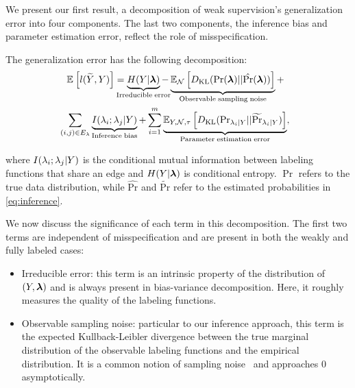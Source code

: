 
We present our first result, a decomposition of weak supervision's generalization error into four components. The last two components, the inference bias and parameter estimation error, reflect the role of misspecification.
\begin{theorem}
The generalization error has the following decomposition:
\begin{align}
    &\E{}{l(\widetilde{Y}, Y)} = \underbrace{H(Y | \bm{\lf})}_{\mathclap{\mathrm{Irreducible \; error}}} - \underbrace{\E{\N}{\KL(\Pr(\bm{\lf}) || \hat{\Pr}(\bm{\lf}))}}_{\mathrm{Observable \; sampling \; noise}} + \nonumber \\ %
    &\sum_{\mathclap{(i, j) \in E_{\lf}}} \;\;\; \underbrace{I(\lf_i; \lf_j | Y)}_{\mathrm{Inference \; bias}} +  \sum_{i = 1}^m \underbrace{\E{Y, \N, \tau}{\KL(\mathrm{Pr}_{\lf_i | Y} || \widetilde{\Pr}_{\lf_i | Y })}}_{\mathrm{Parameter \;estimation \;error}} \nonumber,
\end{align}

where $I(\lambda_i; \lambda_j | Y)$ is the conditional mutual information between labeling functions that share an edge and $H(Y|\bm{\lambda})$ is conditional entropy. $\Pr$ refers to the true data distribution, while $\hat{\mathrm{Pr}}$ and $\widetilde{\mathrm{Pr}}$ refer to the estimated probabilities in \eqref{eq:inference}.

\label{thm:decomposition}
\end{theorem}

We now discuss the significance of each term in this decomposition. The first two terms are independent of misspecification and are present in both the weakly and fully labeled cases:
\begin{itemize}
    \item Irreducible error: this term is an intrinsic property of the distribution of $(Y, \bm{\lambda})$ and is always present in bias-variance decomposition. Here, it roughly measures the quality of the labeling functions.
    \item %
    Observable sampling noise: particular to our inference approach, this term is the expected Kullback-Leibler divergence between the true marginal distribution of the observable labeling functions and the empirical distribution. It is a common notion of sampling noise~\citep{domingos2000unified, yang2020rethinking} and approaches $0$ asymptotically.
\end{itemize}


